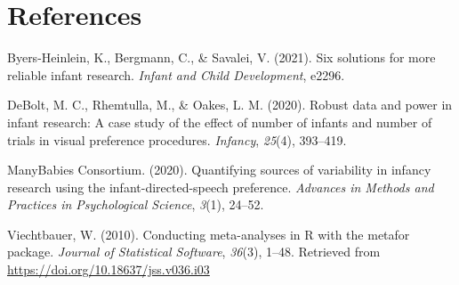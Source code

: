\documentclass[
  man, donotrepeattitle,floatsintext]{apa6}
\newlength{\cslhangindent}
\newlength{\cslentryspacingunit} %
\newenvironment{CSLReferences}[2] %
 {%
  \setlength{\parindent}{0pt}
  \ifodd #1
  \let\oldpar\par
  \def\par{\hangindent=\cslhangindent\oldpar}
  \fi
  \setlength{\parskip}{#2\cslentryspacingunit}
 }%
 {}
\begin{document}
\newpage

\hypertarget{references}{%
\section{References}\label{references}}

\begingroup
\setlength{\parindent}{-0.5in}
\setlength{\leftskip}{0.5in}

\hypertarget{refs}{}
\begin{CSLReferences}{1}{0}
\leavevmode{}%
Byers-Heinlein, K., Bergmann, C., \& Savalei, V. (2021). Six solutions for more reliable infant research. \emph{Infant and Child Development}, e2296.

\leavevmode{}%
DeBolt, M. C., Rhemtulla, M., \& Oakes, L. M. (2020). Robust data and power in infant research: A case study of the effect of number of infants and number of trials in visual preference procedures. \emph{Infancy}, \emph{25}(4), 393--419.

\leavevmode{}%
ManyBabies Consortium. (2020). Quantifying sources of variability in infancy research using the infant-directed-speech preference. \emph{Advances in Methods and Practices in Psychological Science}, \emph{3}(1), 24--52.

\leavevmode{}%
Viechtbauer, W. (2010). Conducting meta-analyses in {R} with the {metafor} package. \emph{Journal of Statistical Software}, \emph{36}(3), 1--48. Retrieved from \url{https://doi.org/10.18637/jss.v036.i03}

\end{CSLReferences}

\endgroup
\end{document}
